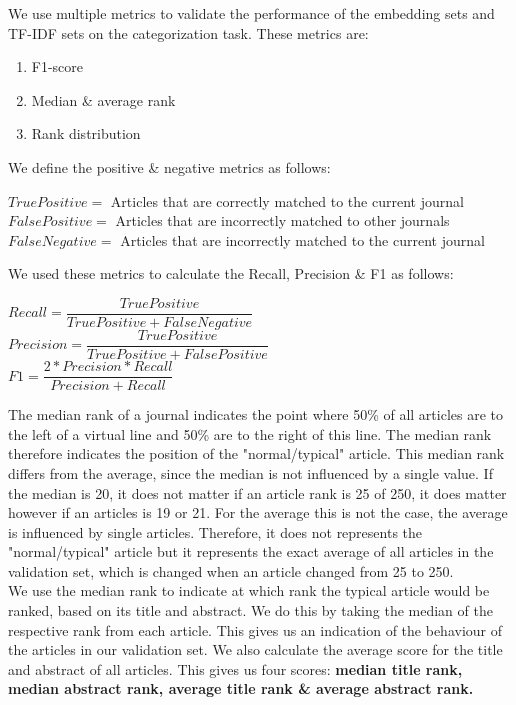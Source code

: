 \documentclass[../../Thesis.tex]{subfiles}
\begin{document}
\clearpage
{}
We use multiple metrics to validate the performance of the embedding sets and TF-IDF sets on the categorization task. These metrics are:
\begin{enumerate}
\item{F1-score}
\item{Median \& average rank}
\item{Rank distribution}
\end{enumerate}
We define the positive \& negative metrics as follows:\\
\begin{jumpin}
$True Positive = $ Articles that are correctly matched to the current journal\\
$False Positive = $ Articles that are incorrectly matched to other journals\\
$False Negative = $ Articles that are incorrectly matched to the current journal\\
\end{jumpin}
We used these metrics to calculate the Recall, Precision \& F1 as follows:\\
\begin{jumpin}
$Recall = \dfrac{True Positive}{True Positive + False Negative}$\vspace{0.1in}\\
$Precision = \dfrac{True Positive}{True Positive + False Positive}$\vspace{0.1in}\\
$F1 = \dfrac{2 * Precision * Recall}{Precision + Recall}$
\end{jumpin}
The median rank of a journal indicates the point where 50\% of all articles are to the left of a virtual line and 50\% are to the right of this line. The median rank therefore indicates the position of the "normal/typical"  article. This median rank differs from the average, since the median is not influenced by a single value. If the median is 20, it does not matter if an article rank is 25 of 250, it does matter however if an articles is 19 or 21. For the average this is not the case, the average is influenced by single articles. Therefore, it does not represents the "normal/typical" article but it represents the exact average of all articles in the validation set, which is changed when an article changed from 25 to 250.\\
We use the median rank to indicate at which rank the typical article would be ranked, based on its title and abstract. We do this by taking the median of the respective rank from each article. This gives us an indication of the behaviour of the articles in our validation set. We also calculate the average score for the title and abstract of all articles. This gives us four scores: \textbf{median title rank, median abstract rank, average title rank \& average abstract rank.}\\
\end{document}
